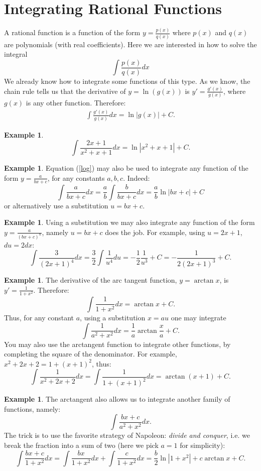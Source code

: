 \documentclass[12pt]{article}
\theoremstyle{definition}
\newtheorem{exa}[thm]{Example}
\begin{document}
\section{Integrating Rational Functions}

A rational function is a function of the form
$y=\frac{p(x)}{q(x)}$ where $p(x)$ and $q(x)$ are polynomials
(with real coefficients). Here we are interested in how to solve
the integral
$$\int \frac{p(x)}{q(x)} dx$$
We already know how to integrate some functions of this type. As
we know, the chain rule tells us that the derivative of $y=\ln
(g(x))$ is $y'=\frac{g'(x)}{g(x)}$, where $g(x)$ is any other
function. Therefore: \begin{eqnarray}\label{log}\int
\frac{g'(x)}{g(x)}dx=\ln|g(x)|+C.
\end{eqnarray}
\begin{exa}
$$\int \frac{2x+1}{x^2+x+1} dx = \ln|x^2+x+1|+C.$$
\end{exa}
\begin{exa}
Equation (\ref{log}) may also be used to integrate any function of
the form $y=\frac{a}{bx+c}$, for any constants $a,b,c$. Indeed:
$$\int \frac{a}{bx+c}dx=\frac{a}{b}\int
\frac{b}{bx+c}dx=\frac{a}{b}\ln|bx+c| +C$$ or alternatively use a
substitution $u=bx+c$.
\end{exa}
\begin{exa}
Using a substitution we may also integrate any function of the
form $y=\frac{a}{(bx+c)^n}$, namely $u=bx+c$ does the job. For
example, using $u=2x+1$, $du=2dx$:
$$\int
\frac{3}{(2x+1)^4}dx=\frac{3}{2}\int\frac{1}{u^4}du=-\frac{1}{2}\frac{1}{u^3}+C=-\frac{1}{2(2x+1)^3}+C.$$
\end{exa}
\begin{exa}
The derivative of the arc tangent function, $y=\arctan x$, is
$y'=\frac{1}{1+x^2}$. Therefore:
$$\int \frac{1}{1+x^2} dx= \arctan x + C.$$
Thus, for any constant $a$, using a substitution $x=au$ one may
integrate
$$\int \frac{1}{a^2+x^2} dx= \frac{1}{a}\arctan \frac{x}{a} + C.$$
You may also use the arctangent function to integrate other
functions, by completing the square of the denominator. For
example, $x^2+2x+2=1+(x+1)^2$, thus:
$$\int \frac{1}{x^2+2x+2}dx=\int
\frac{1}{1+(x+1)^2}dx=\arctan(x+1)+C.$$
\end{exa}
\begin{exa}
The arctangent also allows us to integrate another family of
functions, namely:
$$\int \frac{bx+c}{a^2+x^2}dx.$$
The trick is to use the favorite strategy of Napoleon: {\it divide
and conquer}, i.e. we break the fraction into a sum of two (here
we pick $a=1$ for simplicity):
$$\int \frac{bx+c}{1+x^2}dx=\int \frac{bx}{1+x^2}dx+\int \frac{c}{1+x^2}dx=\frac{b}{2}\ln|1+x^2|+c\arctan x + C.$$
\end{exa}
\end{document}
